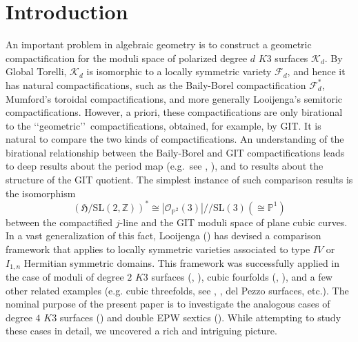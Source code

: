 \documentclass[11pt]{amsart}
\numberwithin{equation}{subsection}
\theoremstyle{plain}
\theoremstyle{remark}
\theoremstyle{definition}
\newcommand{\bP}{\mathbb{P}}
\newcommand{\bZ}{\mathbb{Z}}
\newcommand{\sF}{\mathscr{F}}
\newcommand{\fH}{\mathfrak{H}}
\newcommand{\calO}{\mathcal{O}}
\newcommand{\SL}{\mathrm{SL}}
\newcommand{\gquot}{/\!\!/}
\newcommand{\cF}{{\mathscr F}}
\newcommand{\cK}{{\mathscr K}}
\begin{document}
\section*{Introduction}
An important problem in algebraic geometry is to construct a geometric compactification for the moduli space of polarized degree $d$ $K3$ surfaces $\cK_d$. By Global Torelli, $\cK_d$ is isomorphic to a locally symmetric variety $\cF_d$, and hence it has natural compactifications, such as the Baily-Borel compactification $\sF_d^*$, Mumford's toroidal compactifications, and more generally Looijenga's semitoric compactifications. However, a priori,   these compactifications are only birational to the 
 \lq\lq geometric\rq\rq\ compactifications, obtained, for example, by  GIT. It is natural  to  compare the two kinds of compactifications. An understanding of the birational relationship between the Baily-Borel and GIT compactifications leads to deep results about the period map (e.g.~see \cite{shah}, \cite{lcubic}), and to results about the structure of the GIT quotient. The simplest instance of such comparison results is the isomorphism
%
$$(\fH/\SL(2,\bZ))^*\cong |\calO_{\bP^2}(3)|\gquot \SL(3)(\cong \bP^1)$$
%
between the compactified $j$-line and the GIT moduli space of plane cubic curves.
In  a vast generalization of this fact, Looijenga (\cite{looijenga1, looijengacompact}) has  devised a comparison framework that applies to locally symmetric varieties associated to type $IV$ or $I_{1,n}$  Hermitian symmetric domains. This framework was  successfully applied in the case of moduli of degree $2$ $K3$ surfaces (\cite{looijengavancouver}, \cite{shah}), cubic fourfolds (\cite{lcubic}, \cite{cubic4fold}), and  a few other related examples (e.g. cubic threefolds, see \cite{act},  \cite{ls}, del Pezzo surfaces, etc.). The nominal purpose of the present paper is to investigate the analogous cases of degree $4$ $K3$ surfaces (\cite{shah4}) and double EPW sextics (\cite{epwperiods, epw}). 
While attempting to study these cases in detail, we uncovered a rich and intriguing picture. 

\medskip
\end{document}
